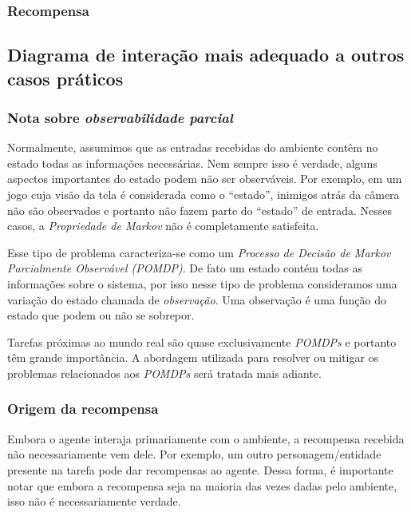 \documentclass{article}
\begin{document}
            \subsubsection{Recompensa}
        
                
        \subsection{Diagrama de interação mais adequado a outros casos práticos}
        
            \subsubsection{Nota sobre \emph{observabilidade parcial}}

                Normalmente, assumimos que as entradas recebidas do ambiente contêm no estado todas as informações necessárias. Nem sempre isso é verdade, alguns aspectos importantes do estado podem não ser observáveis. Por exemplo, em um jogo cuja visão da tela é considerada como o ``estado'', inimigos atrás da câmera não são observados e portanto não fazem parte do ``estado'' de entrada. Nesses casos, a \emph{Propriedade de Markov} não é completamente satisfeita. 
                
                Esse tipo de problema caracteriza-se como um \emph{Processo de Decisão de Markov Parcialmente Observável (POMDP)}. De fato um estado contém todas as informações sobre o sistema, por isso nesse tipo de problema consideramos uma variação do estado chamada de \emph{observação}. Uma observação é uma função do estado que podem ou não se sobrepor.
                
                Tarefas próximas ao mundo real são quase exclusivamente \emph{POMDPs} e portanto têm grande importância. A abordagem utilizada para resolver ou mitigar os problemas relacionados aos \emph{POMDPs} será tratada mais adiante.

            \subsubsection{Origem da recompensa}
            
                Embora o agente interaja primariamente com o ambiente, a recompensa recebida não necessariamente vem dele. Por exemplo, um outro personagem/entidade presente na tarefa pode dar recompensas ao agente. Dessa forma, é importante notar que embora a recompensa seja na maioria das vezes dadas pelo ambiente, isso não é necessariamente verdade.
\end{document}
